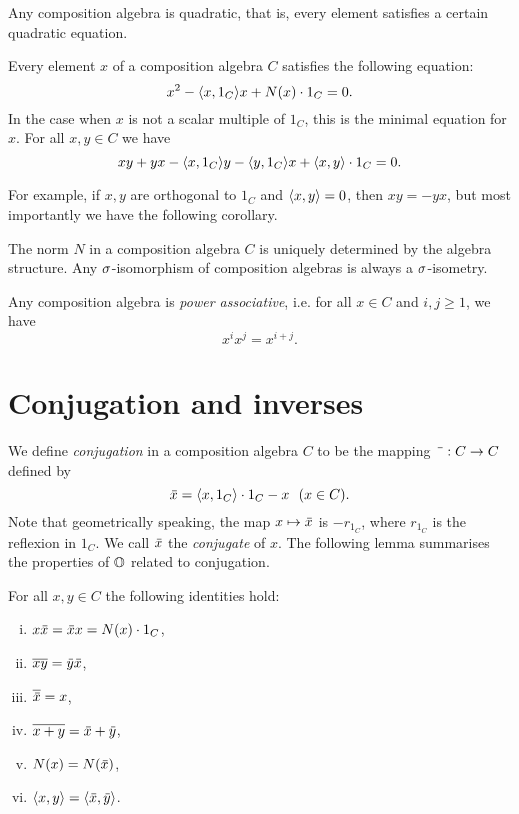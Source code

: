 Any composition algebra is quadratic, that is, every element satisfies a certain quadratic
equation. 

\begin{proposition}
	\label{prop:comp_algebra_quadratic}
	Every element $x$ of a composition algebra $C$ satisfies the following equation:
	\begin{equation}
		x^2 - \langle x, 1_C \rangle x + N(x)\cdot 1_C = 0.
	\end{equation}
	In the case when $x$ is not a scalar multiple of $1_C$, this is the minimal equation for $x$.
	For all $x,y \in C$ we have
	\begin{equation}
		xy + yx - \langle x, 1_C \rangle y - \langle y, 1_C \rangle x + \langle x, y \rangle\cdot 1_C = 0.
	\end{equation}
\end{proposition}

For example, if $x,y$ are orthogonal to $1_C$ and $\langle x, y \rangle = 0$, then $xy = -yx$,
but most importantly we have the following corollary.

\begin{corollary}
	\label{cor:comp_algebra_norm_defined_by_structure}
	The norm $N$ in a composition algebra $C$ is uniquely determined by the algebra structure. 
	Any $\sigma$-isomorphism of composition algebras is always a $\sigma$-isometry.
\end{corollary}

Any composition algebra is \textit{power associative}, i.e. for all $x \in C$ and $i,j\geqslant 1$,
we have
\begin{equation}
	x^i x^j = x^{i+j}.
\end{equation}

\section{Conjugation and inverses}

We define \textit{conjugation} in a composition algebra $C$ to be the mapping
$\ovphantom : C \rightarrow C$ defined by
\begin{equation}
	\label{eq:conjugation}
	\mathord{\mbox{\hspace*{0pt}}\,\overline{\!x\!\!\;}\!\:}\mbox{\hspace*{0pt}} = \langle x, 1_C \rangle\cdot 1_C - x\ \ (x \in C).
\end{equation}
Note that geometrically speaking, the map $x \mapsto \mathord{\mbox{\hspace*{0pt}}\,\overline{\!x\!\!\;}\!\:}\mbox{\hspace*{0pt}}$ is $-r_{1_C}$, 
where $r_{1_C}$ is the reflexion in $1_C$. We call $\mathord{\mbox{\hspace*{0pt}}\,\overline{\!x\!\!\;}\!\:}\mbox{\hspace*{0pt}}$ the \textit{conjugate} of $x$. The
 following lemma summarises the properties of $\mathbb{O}$ related to conjugation. 

\begin{lemma}
	\label{lemma:conj_props}
	For all $x,y \in C$ the following identities hold:
	\begin{enumerate}[(i)]
		\item $x \ovx = \ovx x = N(x)\cdot 1_C$,
		\item $\bar{xy} = \ovy \ovx$, 
		\item $\overline{\mathord{\mbox{\hspace*{0pt}}\,\overline{\!x\!\!\;}\!\:}\mbox{\hspace*{0pt}}} = x$, 
		\item $\bar{x+y} = \ovx + \ovy$,
		\item $N(x) = N(\mathord{\mbox{\hspace*{0pt}}\,\overline{\!x\!\!\;}\!\:}\mbox{\hspace*{0pt}})$,
		\item $\langle x,y \rangle = \inner{\ovx}{\ovy}$. 
	\end{enumerate}
\end{lemma}

